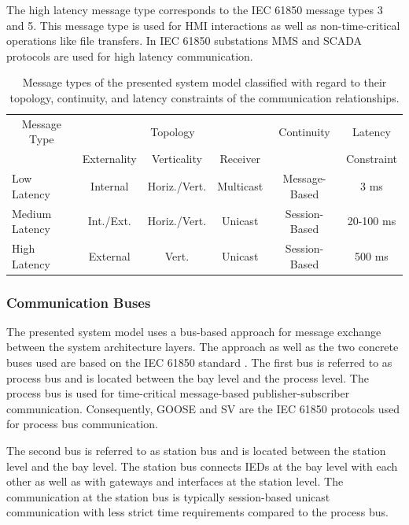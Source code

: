 The high latency message type corresponds to the IEC 61850 message types 3 and 5.
This message type is used for HMI interactions as well as non-time-critical operations like file transfers.
In IEC 61850 substations MMS and SCADA protocols are used for high latency communication.
\begin{table}
    \centering
    \caption{Message types of the presented system model classified with regard to their topology, continuity, and latency constraints of the communication relationships.}
    \label{tab:message_types}
    \begin{tabular}{l c c c c c}
    \toprule
    \multicolumn{1}{c}{Message Type} & \multicolumn{3}{c}{Topology} & Continuity & Latency\\
    & Externality & Verticality & Receiver & & Constraint\\
    \midrule
    Low Latency & Internal & Horiz./Vert. & Multicast & Message-Based & 3 ms\\
    Medium Latency & Int./Ext. & Horiz./Vert. & Unicast & Session-Based & 20-100 ms\\
    High Latency & External & Vert. & Unicast & Session-Based & 500 ms\\
    \bottomrule
    \end{tabular}
    \end{table}

\subsubsection{Communication Buses}
The presented system model uses a bus-based approach for message exchange between the system architecture layers.
The approach as well as the two concrete buses used are based on the IEC 61850 standard \cite{IEC61850P5}.
The first bus is referred to as process bus and is located between the bay level and the process level.
The process bus is used for time-critical message-based publisher-subscriber communication.
Consequently, GOOSE and SV are the IEC 61850 protocols used for process bus communication.

The second bus is referred to as station bus and is located between the station level and the bay level.
The station bus connects IEDs at the bay level with each other as well as with gateways and interfaces at the station level.
The communication at the station bus is typically session-based unicast communication with less strict time requirements compared to the process bus.


